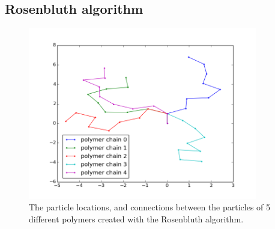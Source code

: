 \documentclass{article}
\begin{document}
\begin{multicols}{2}
\subsection*{Rosenbluth algorithm}
 \begin{figure}[ht]
\centering
\includegraphics[width=10cm]{polymeerplaatje.png}
\caption{The particle locations, and connections between the particles of 5 different polymers created with the Rosenbluth algorithm.}
 \label{fig:polymers}
\end{figure} 

\end{multicols}
\end{document}
